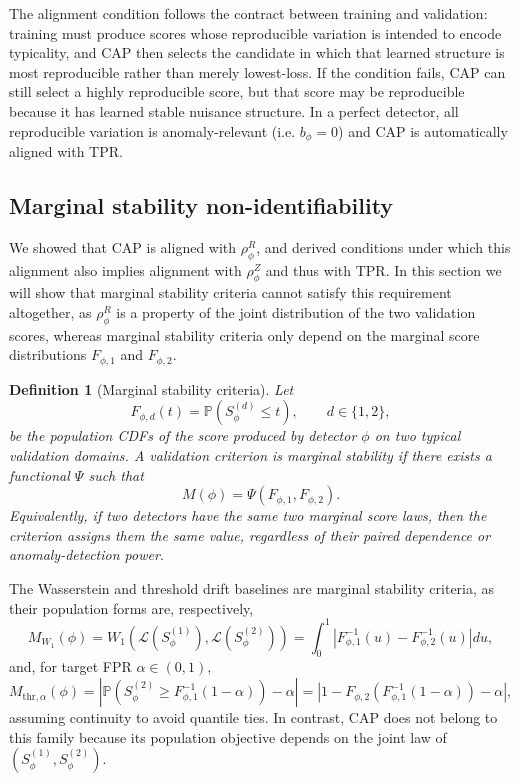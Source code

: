 \documentclass[11pt]{article}
\newtheorem{definition}{Definition}
\newcommand{\Pbb}{\mathbb{P}}
\newcommand{\cL}{\mathcal{L}}
\begin{document}
The alignment condition follows the contract between training and validation: training must produce scores whose reproducible
variation is intended to encode typicality, and CAP then selects the candidate in which that learned structure is most reproducible rather than merely
lowest-loss. If the condition fails,
CAP can still select a highly reproducible score, but that score may be
reproducible because it has learned stable nuisance structure. In a perfect
detector, all reproducible variation is anomaly-relevant (i.e. \(b_\phi=0\)) and CAP is automatically aligned with TPR.

\subsection{Marginal stability non-identifiability}

We showed that CAP is aligned with \(\rho_\phi^R\), and derived conditions under
which this alignment also implies alignment with \(\rho_\phi^Z\) and thus with TPR.
In this section we will show that marginal stability criteria cannot satisfy this requirement
altogether, as \(\rho_\phi^R\) is a property of the joint distribution of the two validation scores,
whereas marginal stability criteria only depend on the marginal score distributions \(F_{\phi,1}\) and \(F_{\phi,2}\).

\begin{definition}[Marginal stability criteria]
\label{def:marginal-stability}
Let
\[
    F_{\phi,d}(t)=\Pbb(S_\phi^{(d)}\le t),
    \qquad d\in\{1,2\},
\]
be the population CDFs of the score produced by detector \(\phi\) on two
typical validation domains. A validation criterion is
\emph{marginal stability} if there exists a functional \(\Psi\) such that
\[
    M(\phi)=\Psi(F_{\phi,1},F_{\phi,2}).
\]
Equivalently, if two detectors have the same two marginal score laws, then
the criterion assigns them the same value, regardless of their paired
dependence or anomaly-detection power.
\end{definition}

The Wasserstein and threshold drift baselines are marginal stability criteria, as
their population forms are, respectively,
\[
    M_{W_1}(\phi)
    =
    W_1\!\left(
        \cL(S_\phi^{(1)}),
        \cL(S_\phi^{(2)})
    \right)
    =
    \int_0^1
    \left|
        F_{\phi,1}^{-1}(u)-F_{\phi,2}^{-1}(u)
    \right|du,
\]
and, for target FPR \(\alpha\in(0,1)\),
\[
    M_{\mathrm{thr},\alpha}(\phi)
    =
    \left|
        \Pbb\!\left(
            S_\phi^{(2)}\ge F_{\phi,1}^{-1}(1-\alpha)
        \right)-\alpha
    \right|
    =
    \left|
        1-F_{\phi,2}\!\left(F_{\phi,1}^{-1}(1-\alpha)\right)-\alpha
    \right|,
\]
assuming continuity to avoid quantile ties. In contrast, CAP does not belong to
this family because its population objective depends on the joint law of
\((S_\phi^{(1)},S_\phi^{(2)})\).
\end{document}
